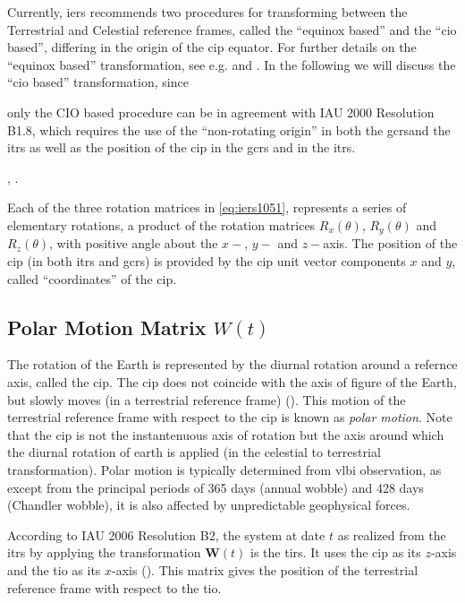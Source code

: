 Currently, \gls{iers} recommends two procedures for transforming between the 
Terrestrial and Celestial reference frames, called the ``equinox based'' 
and the ``\gls{cio} based'', differing in the origin of the \gls{cip} 
equator. For further details on the ``equinox based'' transformation, see 
e.g. \cite{iers2010} and \cite{esaa13}. In the following we will discuss the 
``\gls{cio} based'' transformation, since
\begin{displayquote}
    only the CIO based
procedure can be in agreement with IAU 2000 Resolution B1.8, which requires 
the use of the ``non-rotating origin'' in both the \gls{gcrs}and the \gls{itrs} 
as well as the position of the \gls{cip} in the \gls{gcrs} and in the \gls{itrs}.
\end{displayquote}, \cite{iers2010}.

Each of the three rotation matrices in \ref{eq:iers1051}, represents a series 
of elementary rotations, a product of the rotation matrices $R_x(\theta)$, 
$R_y(\theta)$ and $R_z(\theta)$, with positive angle about the $x-$, $y-$ and 
$z-$axis. The position of the \gls{cip} (in both \gls{itrs} and \gls{gcrs}) is 
provided by the \gls{cip} unit vector components $x$ and $y$, called 
``coordinates'' of the \gls{cip}.

\subsection{Polar Motion Matrix $W(t)$}
\label{ssec:polar-motion-matrix}
The rotation of the Earth is represented by the diurnal rotation around a
refernce axis, called the \gls{cip}. The \gls{cip} does not coincide with 
the axis of figure of the Earth, but slowly moves (in a terrestrial reference 
frame) (\cite{esaa13}). This motion of the terrestrial reference frame 
with respect to the \gls{cip} is known as \emph{polar motion}. Note that the 
\gls{cip} is not the instantenuous axis of rotation but the axis around which the 
diurnal rotation of earth is applied (in the celestial to terrestrial 
transformation). Polar motion is typically determined from \gls{vlbi} 
observation, as except from the principal periods of 365 days (annual wobble) 
and 428 days (Chandler wobble), it is also affected by unpredictable geophysical 
forces.

According to IAU 2006 Resolution B2, the system at date $t$ as realized 
from the \gls{itrs} by applying the transformation $\bm{W}(t)$ is the 
\gls{tirs}. It uses the \gls{cip} as its $z$-axis and the \gls{tio} as 
its $x$-axis (\cite{iers2010}). This matrix gives the position of the 
terrestrial reference frame with respect to the \gls{tio}.


